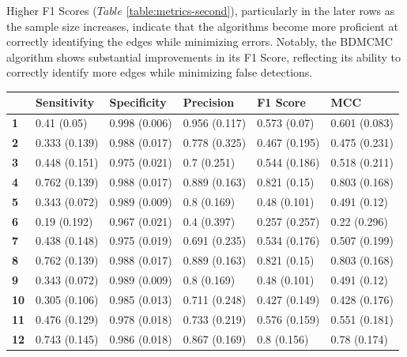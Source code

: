 \documentclass{report}
\begin{document}
Higher F1 Scores ($\textit{Table}$ \ref{table:metrics-second}), particularly in the later rows as the sample size increases, indicate that the algorithms become more proficient at correctly identifying the edges while minimizing errors. Notably, the BDMCMC algorithm shows substantial improvements in its F1 Score, reflecting its ability to correctly identify more edges while minimizing false detections.

\begin{table}[!h]
	\centering
	\begin{tabular}{|l|l|l|l|l|l|}
		\hline
		\textbf{} & \textbf{Sensitivity} & \textbf{Specificity} & \textbf{Precision} & \textbf{F1 Score} & \textbf{MCC} \\ \hline
		\rowcolor{red!10} \textbf{1} & 0.41 (0.05) & 0.998 (0.006) & 0.956 (0.117) & 0.573 (0.07) & 0.601 (0.083) \\ \hline
		\rowcolor{red!10} \textbf{2} & 0.333 (0.139) & 0.988 (0.017) & 0.778 (0.325) & 0.467 (0.195) & 0.475 (0.231) \\ \hline
		\rowcolor{red!10} \textbf{3} & 0.448 (0.151) & 0.975 (0.021) & 0.7 (0.251) & 0.544 (0.186) & 0.518 (0.211) \\ \hline
		\rowcolor{red!10} \textbf{4} & 0.762 (0.139) & 0.988 (0.017) & 0.889 (0.163) & 0.821 (0.15) & 0.803 (0.168) \\ \hline
		\rowcolor{blue!7} \textbf{5} & 0.343 (0.072) & 0.989 (0.009) & 0.8 (0.169) & 0.48 (0.101) & 0.491 (0.12) \\ \hline
		\rowcolor{blue!7} \textbf{6} & 0.19 (0.192) & 0.967 (0.021) & 0.4 (0.397) & 0.257 (0.257) & 0.22 (0.296) \\ \hline
		\rowcolor{blue!7} \textbf{7} & 0.438 (0.148) & 0.975 (0.019) & 0.691 (0.235) & 0.534 (0.176) & 0.507 (0.199) \\ \hline
		\rowcolor{blue!7} \textbf{8} & 0.762 (0.139) & 0.988 (0.017) & 0.889 (0.163) & 0.821 (0.15) & 0.803 (0.168) \\ \hline
		\rowcolor{cyan!10} \textbf{9} & 0.343 (0.072) & 0.989 (0.009) & 0.8 (0.169) & 0.48 (0.101) & 0.491 (0.12) \\ \hline
		\rowcolor{cyan!10} \textbf{10} & 0.305 (0.106) & 0.985 (0.013) & 0.711 (0.248) & 0.427 (0.149) & 0.428 (0.176) \\ \hline
		\rowcolor{cyan!10} \textbf{11} & 0.476 (0.129) & 0.978 (0.018) & 0.733 (0.219) & 0.576 (0.159) & 0.551 (0.181) \\ \hline
		\rowcolor{cyan!10} \textbf{12} & 0.743 (0.145) & 0.986 (0.018) & 0.867 (0.169) & 0.8 (0.156) & 0.78 (0.174) \\ \hline

\end{tabular}
\end{table}
\end{document}
